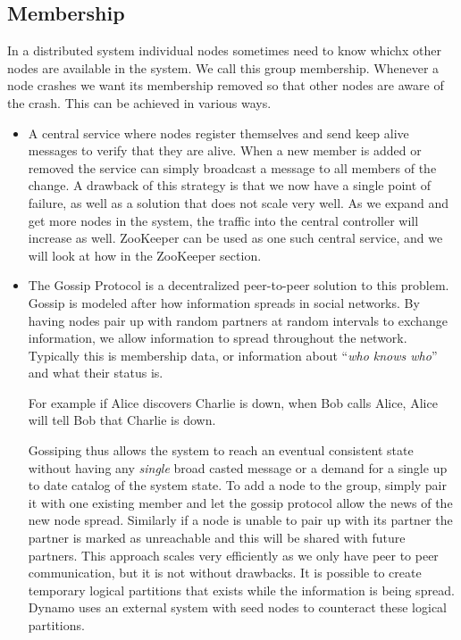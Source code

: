 \subsection{Membership}
In a distributed system individual nodes sometimes need to know whichx other nodes are available in the system. We call this group membership. Whenever a node crashes we want its membership removed so that other nodes are aware of the crash. This can be achieved in various ways. 

\begin{itemize}
\item A central service where nodes register themselves and send keep alive messages to verify that they are alive. When a new member is added or removed the service can simply broadcast a message to all members of the change. A drawback of this strategy is that we now have a single point of failure, as well as a solution that does not scale very well. As we expand and get more nodes in the system, the traffic into the central controller will increase as well. ZooKeeper can be used as one such central service, and we will look at how in the ZooKeeper section.
\item The Gossip Protocol is a decentralized peer-to-peer solution to this problem. Gossip is modeled after how information spreads in social networks. By having nodes pair up with random partners at random intervals to exchange information, we allow information to spread throughout the network. Typically this is membership data, or information about ``\emph{who knows who}'' and what their status is.

For example if Alice discovers Charlie is down, when Bob calls Alice, Alice will tell Bob that Charlie is down.

Gossiping thus allows the system to reach an eventual consistent state without having any \emph{single} broad casted message or a demand for a single up to date catalog of the system state. To add a node to the group, simply pair it with one existing member and let the gossip protocol allow the news of the new node spread. Similarly if a node is unable to pair up with its partner the partner is marked as unreachable and this will be shared with future partners. This approach scales very efficiently as we only have peer to peer communication, but it is not without drawbacks. It is possible to create temporary logical partitions that exists while the information is being spread. Dynamo uses an external system with seed nodes to counteract these logical partitions. 


\end{itemize}
